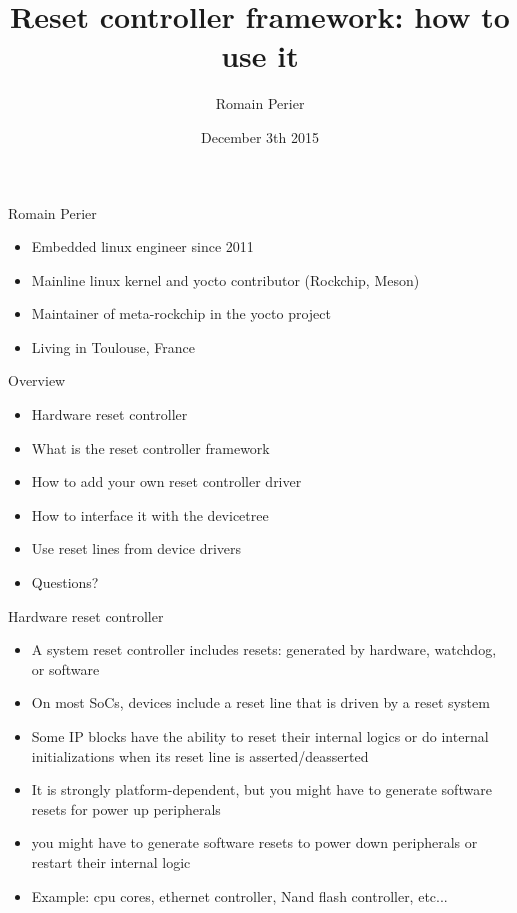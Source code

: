 \documentclass{beamer}
\title{Reset controller framework: how to use it}
\author{Romain Perier}
\institute{Embedded linux engineer and foss developer\newline romain.perier@gmail.com}
\date{December 3th 2015}
\begin{document}
\begin{frame}
\titlepage{}
\end{frame}

\begin{frame}{Romain Perier}
	\begin{itemize}
		\item Embedded linux engineer since 2011
		\item Mainline linux kernel and yocto contributor (Rockchip, Meson)
		\item Maintainer of meta-rockchip in the yocto project
		\item Living in Toulouse, France
	\end{itemize}
\end{frame}

\begin{frame}{Overview}
	\begin{itemize}
		\item Hardware reset controller
		\item What is the reset controller framework
		\item How to add your own reset controller driver
		\item How to interface it with the devicetree
		\item Use reset lines from device drivers
		\item Questions?
	\end{itemize}
\end{frame}

\begin{frame}{Hardware reset controller}
	\begin{itemize}
		\item A system reset controller includes resets: generated by hardware, watchdog, or software
		\item On most SoCs, devices include a reset line that is driven by a reset system
		\item Some IP blocks have the ability to reset their internal logics or do internal initializations when its reset line is asserted/deasserted
		\item It is strongly platform-dependent, but you might have to generate software resets for power up peripherals
		\item you might have to generate software resets to power down peripherals or restart their internal logic
		\item Example: cpu cores, ethernet controller, Nand flash controller, etc...
	\end{itemize}
\end{frame}
\end{document}
